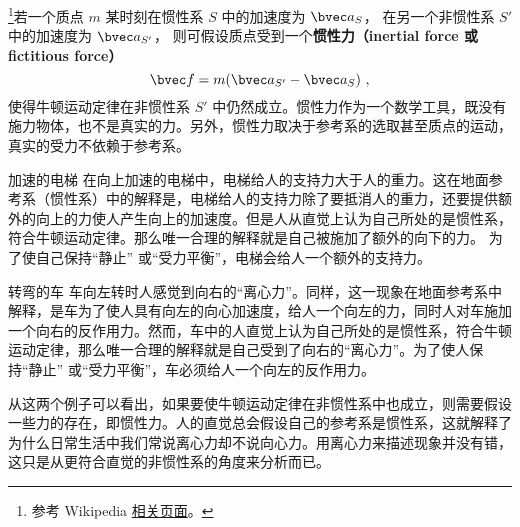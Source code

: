 

\footnote{参考 Wikipedia \href{https://en.wikipedia.org/wiki/Fictitious_force}{相关页面}。}若一个质点 $m$ 某时刻在惯性系 $S$ 中的加速度为 $\bvec a_{S}$， 在另一个非惯性系 $S'$ 中的加速度为 $\bvec a_{S'}$， 则可假设质点受到一个\textbf{惯性力（inertial force 或 fictitious force）}
\begin{equation}\label{eq_Iner_1}
\bvec f = m( \bvec a_{S'} - \bvec a_{S} )~,
\end{equation}
使得牛顿运动定律在非惯性系 $S'$ 中仍然成立。惯性力作为一个数学工具，既没有施力物体，也不是真实的力。另外，惯性力取决于参考系的选取甚至质点的运动，真实的受力不依赖于参考系。

\begin{example}{加速的电梯}\label{ex_Iner_1}
在向上加速的电梯中，电梯给人的支持力大于人的重力。这在地面参考系（惯性系）中的解释是，电梯给人的支持力除了要抵消人的重力，还要提供额外的向上的力使人产生向上的加速度。但是人从直觉上认为自己所处的是惯性系，符合牛顿运动定律。那么唯一合理的解释就是自己被施加了额外的向下的力。 为了使自己保持“静止” 或“受力平衡”，电梯会给人一个额外的支持力。
\end{example}

\begin{example}{转弯的车}
车向左转时人感觉到向右的“离心力”。同样，这一现象在地面参考系中解释，是车为了使人具有向左的向心加速度，给人一个向左的力，同时人对车施加一个向右的反作用力。然而，车中的人直觉上认为自己所处的是惯性系，符合牛顿运动定律，那么唯一合理的解释就是自己受到了向右的“离心力”。为了使人保持“静止” 或“受力平衡”，车必须给人一个向左的反作用力。
\end{example}

从这两个例子可以看出，如果要使牛顿运动定律在非惯性系中也成立，则需要假设一些力的存在，即惯性力。人的直觉总会假设自己的参考系是惯性系，这就解释了为什么日常生活中我们常说离心力却不说向心力。用离心力来描述现象并没有错，这只是从更符合直觉的非惯性系的角度来分析而已。

